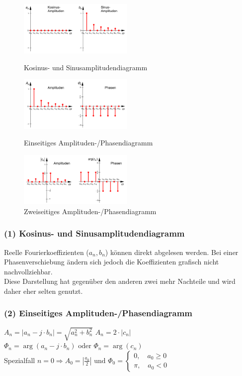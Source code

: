 \begin{figure}[htbp]
	\centering
	\begin{minipage}[b]{5.5cm}
		\includegraphics[width=5.5cm]{./bilder/spektren_cossin.png}
		\caption{Kosinus- und Sinusamplitudendiagramm} 
	\end{minipage}
	\hspace{1cm}
	\begin{minipage}[b]{5.5cm}
		\includegraphics[width=5.5cm]{./bilder/spektren_einseitig.png} 
		\caption{Einseitiges Amplituden-/Phasendiagramm} 
	\end{minipage}
	\hspace{1cm}
	\begin{minipage}[b]{5.5cm}
		\includegraphics[width=5.5cm]{./bilder/spektren_zweiseitig.png} 
		\caption{Zweiseitiges Amplituden-/Phasendiagramm} 
	\end{minipage}
\end{figure}

\subsubsection{(1) Kosinus- und Sinusamplitudendiagramm} 
Reelle Fourierkoeffizienten ($a_n, b_n$) können direkt abgelesen werden. 
Bei einer Phasenverschiebung ändern sich jedoch die Koeffizienten grafisch nicht nachvollziehbar. \\
Diese Darstellung hat gegenüber den anderen zwei mehr Nachteile und wird daher eher selten genutzt.

\subsubsection{(2) Einseitiges Amplituden-/Phasendiagramm} 
$A_n = |a_n - j \cdot b_n| = \sqrt{a_n^2 + b_n^2}$  $A_n = 2 \cdot |c_n| \qquad$
$\Phi_n = \arg(a_n - j \cdot b_n) \text{ oder } \Phi_n = \arg(c_n) $ \\
Spezialfall $n=0 \Rightarrow A_0 = |\frac{a_0}{2}| \text{ und } \Phi_0 = \left\{
		\begin{array}{l} 
			0, \quad a_0 \geq 0\\
			\pi, \quad a_0 < 0  
		\end{array}
	    \right. $

